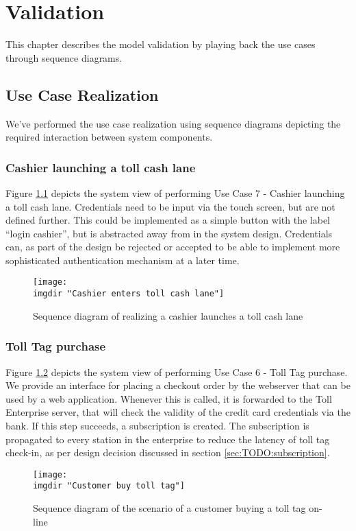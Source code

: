 \chapter{Validation}
This chapter describes the model validation by playing back the use cases through sequence diagrams.
\section{Use Case Realization}
We've performed the use case realization using sequence diagrams depicting the required interaction between system components.
\subsection{Cashier launching a toll cash lane}
Figure \ref{fig:seq_diag:launches_a_toll_cash_lane} depicts the system view of performing Use Case 7 - Cashier launching a toll cash lane. Credentials need to be input via the touch screen, but are not defined further. This could be implemented as a simple button with the label ``login cashier'', but is abstracted away from in the system design. Credentials can, as part of the design be rejected or accepted to be able to implement more sophisticated authentication mechanism at a later time.
\begin{figure} %
  \texttt{[image: \\imgdir "Cashier enters toll cash lane"]}
  \caption{Sequence diagram of realizing a cashier launches a toll cash lane}
  \label{fig:seq_diag:launches_a_toll_cash_lane}
\end{figure}

\subsection{Toll Tag purchase}
Figure \ref{fig:seq_diag:customer_orders_toll_tag_online} depicts the system view of performing Use Case 6 - Toll Tag purchase. We provide an interface for placing a checkout order by the webserver that can be used by a web application. Whenever this is called, it is forwarded to the Toll Enterprise server, that will check the validity of the credit card credentials via the bank. If this step succeeds, a subscription is created. The subscription is propagated to every station in the enterprise to reduce the latency of toll tag check-in, as per design decision discussed in section \ref{sec:TODO:subscription}.
\begin{figure} %
  \texttt{[image: \\imgdir "Customer buy toll tag"]}
  \caption{Sequence diagram of the scenario of a customer buying a toll tag on-line}
  \label{fig:seq_diag:customer_orders_toll_tag_online}
\end{figure}


